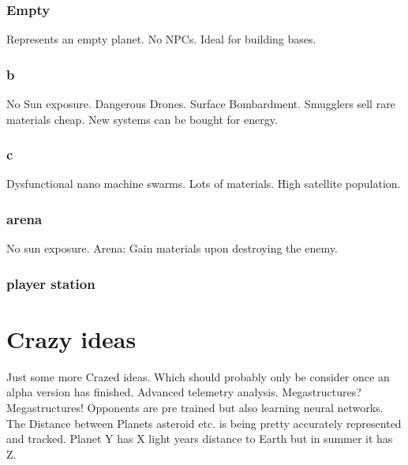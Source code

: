 \documentclass[a4paper]{scrreprt}
\begin{document}
\begin{alpha-feature}
            \subsection{Empty}
               Represents an empty planet. 
               No NPCs.
               Ideal for building bases.
            \subsection{b}
                No Sun exposure.
                Dangerous Drones.
                Surface Bombardment.
                Smugglers sell rare materials cheap.
                New systems can be bought for energy.
            \subsection{c}
                Dysfunctional nano machine swarms.
                Lots of materials.
                High satellite population.
            \subsection{arena}
                No sun exposure.
                Arena: Gain materials upon destroying the enemy.
            \subsection{player station}
\end{alpha-feature}
        

\chapter{Crazy ideas}
Just some more Crazed ideas. Which should probably only be consider once an alpha version has finished.
    Advanced telemetry analysis.
    Megastructures? Megastructures!
    Opponents are pre trained but also learning neural networks.
    The Distance between Planets asteroid etc. is being pretty accurately represented and tracked. Planet Y has X light years distance to Earth but in summer it has Z. 
\end{document}
